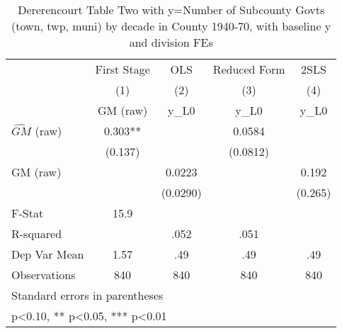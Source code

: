 \begin{table}[htbp]\centering
\def\sym#1{\ifmmode^{#1}\else\(^{#1}\)\fi}
\caption{Dererencourt Table Two with y=Number of Subcounty Govts (town, twp, muni) by decade in County 1940-70, with baseline y and division FEs}
\begin{tabular}{l*{4}{c}}
\toprule
                    & First Stage   &         OLS   &Reduced Form   &        2SLS   \\
                    &\multicolumn{1}{c}{(1)}&\multicolumn{1}{c}{(2)}&\multicolumn{1}{c}{(3)}&\multicolumn{1}{c}{(4)}\\
                    &\multicolumn{1}{c}{GM  (raw)}&\multicolumn{1}{c}{y\_L0}&\multicolumn{1}{c}{y\_L0}&\multicolumn{1}{c}{y\_L0}\\
\midrule
$\hat{GM}$ (raw)    &       0.303** &               &      0.0584   &               \\
                    &     (0.137)   &               &    (0.0812)   &               \\
\addlinespace
GM  (raw)           &               &      0.0223   &               &       0.192   \\
                    &               &    (0.0290)   &               &     (0.265)   \\
\midrule
F-Stat              &        15.9   &               &               &               \\
R-squared           &               &        .052   &        .051   &               \\
Dep Var Mean        &        1.57   &         .49   &         .49   &         .49   \\
Observations        &         840   &         840   &         840   &         840   \\
\bottomrule
\multicolumn{5}{l}{\footnotesize Standard errors in parentheses}\\
\multicolumn{5}{l}{\footnotesize * p<0.10, ** p<0.05, *** p<0.01}\\
\end{tabular}
\end{table}
